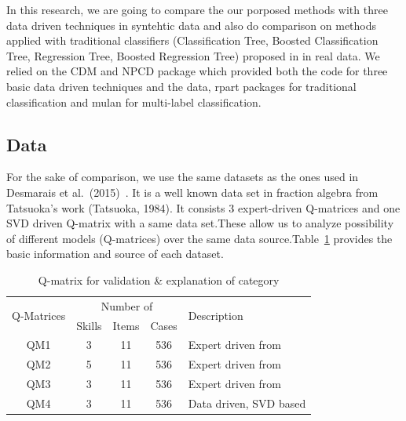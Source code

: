 \documentclass[11pt]{article}
\begin{document}
 In this research, we are going to compare the our porposed methods with three data driven techniques\cite{chiu2013statistical,de2008empirically,de2009dina,desmarais2013matrix} in syntehtic data and also do comparison on methods applied with traditional classifiers (Classification Tree, Boosted Classification Tree, Regression Tree, Boosted Regression Tree) proposed in\cite{desmarais2015combining} in real data. We relied on the CDM \cite{CDM} and NPCD package which provided both the code for three basic data driven techniques and the data, rpart packages for traditional classification and mulan \cite{Tsoumakas2010MLD} for multi-label classification.
 
\subsection{Data}
For the sake of comparison, we use the same datasets as the ones used in Desmarais et al.\ (2015)~\cite{tatsuoka1983rule,desmarais2015combining}. It is a well known data set in
fraction algebra from Tatsuoka's work (Tatsuoka, 1984)\cite{tatsuoka1983rule}. It consists 3 expert-driven Q-matrices and one SVD driven Q-matrix with a same data set.These allow us to analyze possibility of different models (Q-matrices) over the same data source.Table~\ref{tab:qm} provides the basic information and source of each dataset.   






\begin{table}[h] 
\begin{center}
  \caption{Q-matrix for validation \& explanation of category}\label{tab:qm}
  \begin{tabular}{|ccccp{4cm}<{\raggedright}|}
  \hline
  \toprule
\multirow{2}{*}{Q-Matrices} & \multicolumn{3}{c}{Number of} & \multirow{2}{*|}{Description} \\
  \cline{2-4}
  & Skills &  Items & \multicolumn{1}{c}{Cases} & \\
  \midrule
QM1 & 3 & 11 & 536 & {Expert driven from \cite{henson2009defining} } \\
	\hline
QM2 & 5 & 11 & 536 & {Expert driven from \cite{de2008empirically} } \\  
 	\hline
QM3 & 3 & 11 & 536 & {Expert driven from \cite{CDM}} \\  
  	\hline 
QM4 & 3 & 11 & 536 & {Data driven, SVD based} \\  
  	\hline
  	\end{tabular}  
\end{center}	
\end{table}
\end{document}
